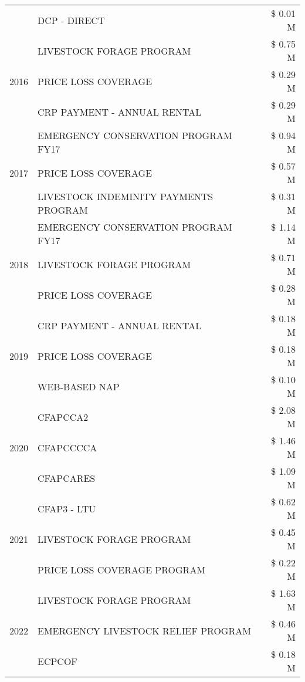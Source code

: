 \begin{tabular}{llr}
 & DCP - DIRECT & \$ 0.01 M \\
\cline{1-3}
\multirow[t]{3}{*}{2016} & LIVESTOCK FORAGE PROGRAM & \$ 0.75 M \\
 & PRICE LOSS COVERAGE & \$ 0.29 M \\
 & CRP PAYMENT - ANNUAL RENTAL & \$ 0.29 M \\
\cline{1-3}
\multirow[t]{3}{*}{2017} & EMERGENCY CONSERVATION PROGRAM FY17 & \$ 0.94 M \\
 & PRICE LOSS COVERAGE & \$ 0.57 M \\
 & LIVESTOCK INDEMINITY PAYMENTS PROGRAM & \$ 0.31 M \\
\cline{1-3}
\multirow[t]{3}{*}{2018} & EMERGENCY CONSERVATION PROGRAM FY17 & \$ 1.14 M \\
 & LIVESTOCK FORAGE PROGRAM & \$ 0.71 M \\
 & PRICE LOSS COVERAGE & \$ 0.28 M \\
\cline{1-3}
\multirow[t]{3}{*}{2019} & CRP PAYMENT - ANNUAL RENTAL & \$ 0.18 M \\
 & PRICE LOSS COVERAGE & \$ 0.18 M \\
 & WEB-BASED NAP & \$ 0.10 M \\
\cline{1-3}
\multirow[t]{3}{*}{2020} & CFAPCCA2 & \$ 2.08 M \\
 & CFAPCCCCA & \$ 1.46 M \\
 & CFAPCARES & \$ 1.09 M \\
\cline{1-3}
\multirow[t]{3}{*}{2021} & CFAP3 - LTU & \$ 0.62 M \\
 & LIVESTOCK FORAGE PROGRAM & \$ 0.45 M \\
 & PRICE LOSS COVERAGE PROGRAM & \$ 0.22 M \\
\cline{1-3}
\multirow[t]{3}{*}{2022} & LIVESTOCK FORAGE PROGRAM & \$ 1.63 M \\
 & EMERGENCY LIVESTOCK RELIEF PROGRAM & \$ 0.46 M \\
 & ECPCOF & \$ 0.18 M \\
\cline{1-3}
\bottomrule
\end{tabular}
